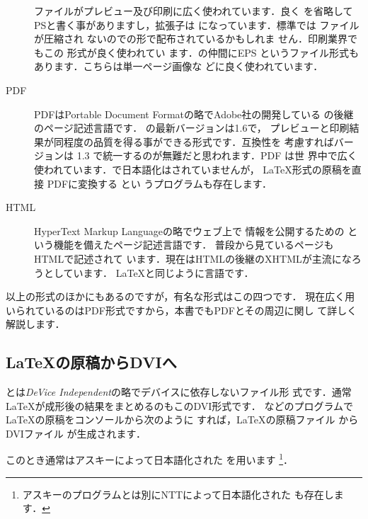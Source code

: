 \begin{description}
  ファイルがプレビュー及び印刷に広く使われています．良く
  {\PS}を省略してPSと書く事がありますし，拡張子は
  になっています．標準では  ファイルが圧縮され
  ないのでの形で配布されているかもしれま
  せん．印刷業界でもこの{\PS}  形式が良く使われてい
  ます．{\PS}の仲間にEPS
  というファイル形式もあります．こちらは単一ページ画像な
  どに良く使われています．
\item[PDF]
%
  PDFはPortable Document Formatの略でAdobe社の開発している
  {\PS}の後継のページ記述言語です．
  \genzai の最新バージョンは1.6で，
  プレビューと印刷結果が同程度の品質を得る事ができる形式です．互換性を
  考慮すればバージョンは 1.3 で統一するのが無難だと思われます．PDF は世
  界中で広く使われています．\genzai で日本語化はされていませんが，
  {\LaTeX}形式の原稿を直接 PDFに変換する \Prog[pdfLaTeX]{\PDFLaTeX}とい
  うプログラムも存在します．%
\item[HTML]
   HyperText Markup Languageの略でウェブ上で
  情報を公開するための 
  という機能を備えたページ記述言語です．
  普段から見ているページもHTMLで記述されて
  います．現在はHTMLの後継のXHTMLが主流になろうとしています．
  {\LaTeX}と同じように言語です．
\end{description}
以上の形式のほかにもあるのですが，有名な形式はこの四つです．
現在広く用いられているのはPDF形式ですから，本書でもPDFとその周辺に関し
て詳しく解説します．


\subsection{\LaTeX の原稿からDVIへ}
とは\emph{DeVice Independent}の略でデバイスに依存しないファイル形
式です．通常{\LaTeX}が成形後の結果をまとめるのもこのDVI形式です．
などのプログラムで{\LaTeX}の原稿をコンソールから次のように
すれば，\LaTeX の原稿ファイル  からDVIファイル
 が生成されます．

\begin{InTerm}
\end{InTerm}

このとき通常はアスキーによって日本語化された \pLaTeX を用います
\footnote{アスキーのプログラムとは別にNTTによって日本語化された\JLaTeX
も存在します．}．

